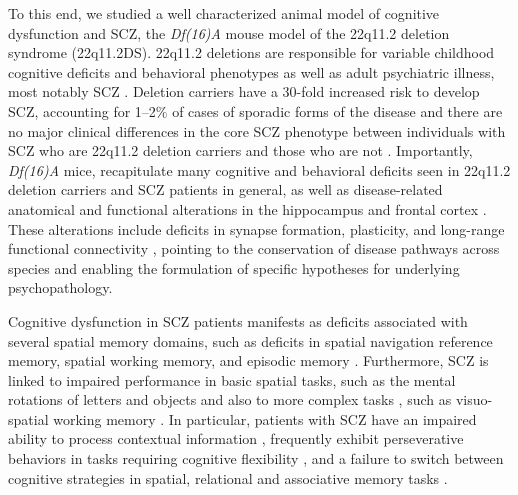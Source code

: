 To this end, we studied a well characterized animal model of cognitive dysfunction and SCZ, the \emph{Df(16)A\super{+/-}} mouse model of the 22q11.2 deletion syndrome (22q11.2DS). 22q11.2 deletions are responsible for variable childhood cognitive deficits and behavioral phenotypes as well as adult psychiatric illness, most notably SCZ \citep{Biswas2016, Schneider2014}. Deletion carriers have a 30-fold increased risk to develop SCZ, accounting for 1–2$\%$ of cases of sporadic forms of the disease \citep{Karayiorgou2010, Xu2008} and there are no major clinical differences in the core SCZ phenotype between individuals with SCZ who are 22q11.2 deletion carriers and those who are not \citep{Bassett2003}\citep{Bassett1998}. Importantly, \emph{Df(16)A\super{+/-}} mice, recapitulate many cognitive and behavioral deficits seen in 22q11.2 deletion carriers and SCZ patients in general, as well as disease-related anatomical and functional alterations in the hippocampus and frontal cortex \citep{Glausier2013}\citep{Scariati2016}\citep{Schmitt2015}\citep{Schmitt2016}\citep{Spencer2004}\citep{Uhlhaas2010}\citep{Weinberger2016}. These alterations include deficits in synapse formation, plasticity, and long-range functional connectivity \citep{Drew2011b}\citep{Mukai2008}\citep{Stark2008}\citep{Fenelon2013}\citep{Mukai2015}\citep{Sigurdsson2010}\citep{Tamura2016}, pointing to the conservation of disease pathways across species and enabling the formulation of specific hypotheses for underlying psychopathology.

Cognitive dysfunction in SCZ patients manifests as deficits associated with several spatial memory domains, such as deficits in spatial navigation reference memory, spatial working memory, and episodic memory \citep{Hanlon2006}\citep{Piskulic2007}\citep{Ranganath2008}\citep{Schaefer2013}\citep{Wilkins2013}. Furthermore, SCZ is linked to impaired performance in basic spatial tasks, such as the mental rotations of letters and objects \citep{DeVignemont2006} and also to more complex tasks \citep{Landgraf2011}\citep{Weniger2008}, such as visuo-spatial working memory \citep[see review][]{Piskulic2007}. In particular, patients with SCZ have an impaired ability to process contextual information \citep{Barch2003}\citep{Cohen1999}\citep{Maren2013}, frequently exhibit perseverative behaviors in tasks requiring cognitive flexibility \citep{Crider1997}\citep{Leeson2009}\citep{Morice1990}, and a failure to switch between cognitive strategies in spatial, relational and associative memory tasks \citep{Armstrong2012}\citep{Hanlon2006}\citep{Sheffield2012}\citep{Wilkins2013}.

